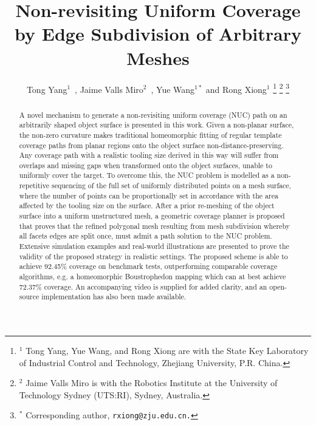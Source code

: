 \documentclass[lettersize,journal]{IEEEtran}
\begin{document}
\title{Non-revisiting Uniform Coverage by Edge Subdivision of Arbitrary Meshes}

\author{Tong Yang$^1$~, Jaime Valls Miro$^2$~, Yue Wang$^{1*}$ and Rong Xiong$^1$
\thanks{$^1$ Tong Yang, Yue Wang, and Rong Xiong are with the State Key 
Laboratory of Industrial Control and Technology, Zhejiang University, P.R. China.}
\thanks{$^2$ Jaime Valls Miro is with the Robotics Institute at the University of Technology Sydney (UTS:RI), Sydney, Australia.}
\thanks{$^*$ Corresponding author, %
{\tt\small rxiong@zju.edu.cn.}}
}

\maketitle
\begin{abstract}
A novel mechanism to generate a non-revisiting uniform coverage (NUC) path on an arbitrarily shaped object surface is presented in this work. 
Given a non-planar surface, the non-zero curvature makes traditional homeomorphic fitting of regular template coverage paths from planar regions onto the 
object surface non-distance-preserving. 
Any coverage path with a realistic tooling size derived in this way will suffer from overlaps and missing gaps when transformed onto the object surfaces, 
unable to uniformly cover the target.
To overcome this, the NUC problem is modelled as a non-repetitive sequencing of the full set of uniformly distributed points on a mesh surface, 
where the number of points can be proportionally set in accordance with the area affected by the tooling size on the surface. 
After a prior re-meshing of the object surface into a uniform unstructured mesh, a geometric coverage planner is proposed that proves
that the refined polygonal mesh resulting from mesh subdivision whereby all facets edges are split once, must admit a path solution to the NUC problem.
Extensive simulation examples and real-world illustrations are presented to prove the validity of the proposed strategy in realistic settings. 
The proposed scheme is able to achieve 92.45\% coverage on benchmark tests, outperforming comparable coverage 
algorithms, e.g. a homeomorphic Boustrophedon mapping which can at best achieve 72.37\% coverage.
An accompanying video is supplied for added clarity, and an open-source implementation has also been made available. 
\end{abstract}
\end{document}
